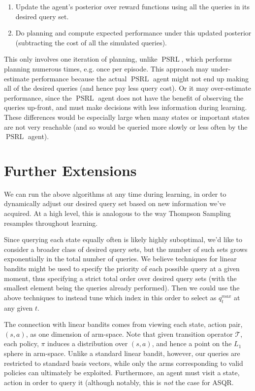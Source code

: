\documentclass{article}
\begin{document}
\begin{enumerate}
\item Update the agent's posterior over reward functions using all the queries in its desired query set.%
\item Do planning and compute expected performance under this updated posterior (subtracting the cost of all the simulated queries).
\end{enumerate}

This only involves one iteration of planning, unlike $\mathop{PSRL}$, which performs planning numerous times, e.g. once per episode.
This approach may under-estimate performance because the actual $\mathop{PSRL}$ agent might not end up making all of the desired queries (and hence pay less query cost).
Or it may over-estimate performance, since the $\mathop{PSRL}$ agent does not have the benefit of observing the queries up-front, and must make decisions with less information during learning.
These differences would be especially large when many states or important states are not very reachable (and so would be queried more slowly or less often by the $\mathop{PSRL}$ agent).

\section{Further Extensions}
We can run the above algorithms at any time during learning, in order to dynamically adjust our desired query set based on new information we've acquired.
At a high level, this is analogous to the way Thompson Sampling resamples throughout learning.

Since querying each state equally often is likely highly suboptimal, we'd like to consider a broader class of desired query sets, but the number of such sets grows exponentially in the total number of queries.
We believe techniques for linear bandits might be used to specify the priority of each possible query at a given moment, thus specifying a strict total order over desired query sets (with the smallest element being the queries already performed).
Then we could use the above techniques to instead tune which index in this order to select as $q^{max}_t$ at any given $t$.

The connection with linear bandits comes from viewing each state, action pair, $(s,a)$, as one dimension of arm-space.
Note that given transition operator $\mathcal{T}$, each policy, $\pi$ induces a distribution over $(s,a)$, and hence a point on the $L_1$ sphere in arm-space.
Unlike a standard linear bandit, however, our queries are restricted to standard basis vectors, while only the arms corresponding to valid policies can ultimately be exploited.
Furthermore, an agent must visit a state, action in order to query it (although notably, this is \emph{not} the case for ASQR.






%

\end{document}
